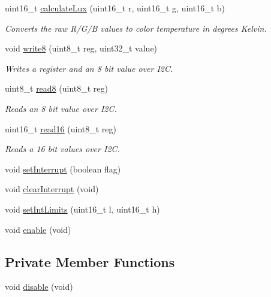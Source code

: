 \begin{DoxyCompactItemize}
uint16\+\_\+t \hyperlink{class_adafruit___t_c_s34725_a10b9be546ee3bdf04e0380161aad589b}{calculate\+Lux} (uint16\+\_\+t r, uint16\+\_\+t g, uint16\+\_\+t b)
\begin{DoxyCompactList}\small\item\em Converts the raw R/\+G/B values to color temperature in degrees Kelvin. \end{DoxyCompactList}\item 
void \hyperlink{class_adafruit___t_c_s34725_aa526557ad0d76b3b6e31e6197de583e6}{write8} (uint8\+\_\+t reg, uint32\+\_\+t value)
\begin{DoxyCompactList}\small\item\em Writes a register and an 8 bit value over I2C. \end{DoxyCompactList}\item 
uint8\+\_\+t \hyperlink{class_adafruit___t_c_s34725_a3ffafbdd475d6baf9abda8dd067b5319}{read8} (uint8\+\_\+t reg)
\begin{DoxyCompactList}\small\item\em Reads an 8 bit value over I2C. \end{DoxyCompactList}\item 
uint16\+\_\+t \hyperlink{class_adafruit___t_c_s34725_a6b9b65ff0f1e57797a1c05a43fd25385}{read16} (uint8\+\_\+t reg)
\begin{DoxyCompactList}\small\item\em Reads a 16 bit values over I2C. \end{DoxyCompactList}\item 
void \hyperlink{class_adafruit___t_c_s34725_ae477b116ac93cf075be20637207aee57}{set\+Interrupt} (boolean flag)
\item 
void \hyperlink{class_adafruit___t_c_s34725_a731a3542039027f75170b667aaf8e3a0}{clear\+Interrupt} (void)
\item 
void \hyperlink{class_adafruit___t_c_s34725_ac17b2447df066e30d1e64fe764f88770}{set\+Int\+Limits} (uint16\+\_\+t l, uint16\+\_\+t h)
\item 
void \hyperlink{class_adafruit___t_c_s34725_ad9a0e1f4f77d32dc0a6d604f7d1d5586}{enable} (void)
\end{DoxyCompactItemize}
\subsection*{Private Member Functions}
\begin{DoxyCompactItemize}
\item 
void \hyperlink{class_adafruit___t_c_s34725_a79ac9b01a540f132d4bbf2edd2d6e8a2}{disable} (void)
\end{DoxyCompactItemize}

